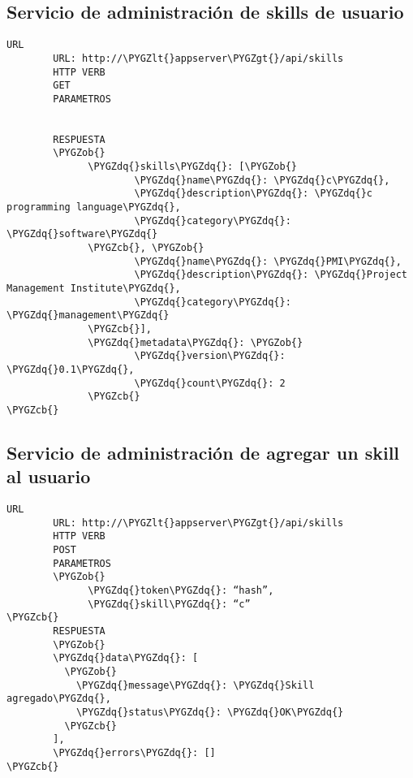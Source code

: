 \documentclass[a4paper,10pt,spanish]{sphinxmanual}
\def\PYGZob{\char`\{}
\def\PYGZcb{\char`\}}
\def\PYGZlt{\char`\<}
\def\PYGZgt{\char`\>}
\def\PYGZdq{\char`\"}
\begin{document}
\subsection{Servicio de administración de skills de usuario}
\label{apiRest:servicio-de-administracion-de-skills-de-usuario}
\begin{Verbatim}[commandchars=\\\{\}]
URL
        URL: http://\PYGZlt{}appserver\PYGZgt{}/api/skills
        HTTP VERB
        GET
        PARAMETROS


        RESPUESTA
        \PYGZob{}
              \PYGZdq{}skills\PYGZdq{}: [\PYGZob{}
                      \PYGZdq{}name\PYGZdq{}: \PYGZdq{}c\PYGZdq{},
                      \PYGZdq{}description\PYGZdq{}: \PYGZdq{}c programming language\PYGZdq{},
                      \PYGZdq{}category\PYGZdq{}: \PYGZdq{}software\PYGZdq{}
              \PYGZcb{}, \PYGZob{}
                      \PYGZdq{}name\PYGZdq{}: \PYGZdq{}PMI\PYGZdq{},
                      \PYGZdq{}description\PYGZdq{}: \PYGZdq{}Project Management Institute\PYGZdq{},
                      \PYGZdq{}category\PYGZdq{}: \PYGZdq{}management\PYGZdq{}
              \PYGZcb{}],
              \PYGZdq{}metadata\PYGZdq{}: \PYGZob{}
                      \PYGZdq{}version\PYGZdq{}: \PYGZdq{}0.1\PYGZdq{},
                      \PYGZdq{}count\PYGZdq{}: 2
              \PYGZcb{}
\PYGZcb{}
\end{Verbatim}


\subsection{Servicio de administración de agregar un skill al usuario}
\label{apiRest:servicio-de-administracion-de-agregar-un-skill-al-usuario}
\begin{Verbatim}[commandchars=\\\{\}]
URL
        URL: http://\PYGZlt{}appserver\PYGZgt{}/api/skills
        HTTP VERB
        POST
        PARAMETROS
        \PYGZob{}
              \PYGZdq{}token\PYGZdq{}: “hash”,
              \PYGZdq{}skill\PYGZdq{}: “c”
\PYGZcb{}
        RESPUESTA
        \PYGZob{}
        \PYGZdq{}data\PYGZdq{}: [
          \PYGZob{}
            \PYGZdq{}message\PYGZdq{}: \PYGZdq{}Skill agregado\PYGZdq{},
            \PYGZdq{}status\PYGZdq{}: \PYGZdq{}OK\PYGZdq{}
          \PYGZcb{}
        ],
        \PYGZdq{}errors\PYGZdq{}: []
\PYGZcb{}
\end{Verbatim}
\end{document}
